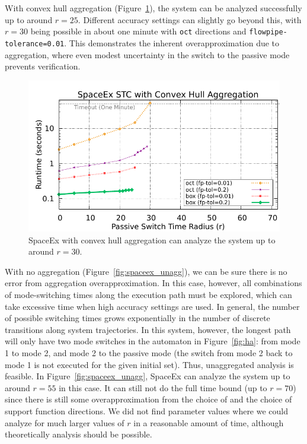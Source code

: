 With convex hull aggregation (Figure~\ref{fig:spaceex_chull}), the system can be analyzed successfully up to around $r=25$.
%
Different accuracy settings can slightly go beyond this, with $r=30$ being possible in about one minute with \texttt{oct} directions and
\texttt{flowpipe-tolerance=0.01}.
%
This demonstrates the inherent overapproximation due to aggregation, where even modest uncertainty in the switch to the passive mode
prevents verification.

\begin{figure}[t]
\centerline{\includegraphics[width=0.9\columnwidth]{images/chull.pdf}}
\caption{SpaceEx with convex hull aggregation can analyze the system up to around $r=30$.}
\label{fig:spaceex_chull}
\end{figure}

With no aggregation (Figure~\ref{fig:spaceex_unagg}), we can be sure there is no error from aggregation overapproximation.
%
In this case, however, all combinations of mode-switching times along the execution path must be explored,
which can take excessive time when high accuracy settings are used.
%
In general, the number of possible switching times grows exponentially in the number of discrete transitions along system trajectories.
%
In this system, however, the longest path will only have two mode switches in the automaton in Figure~\ref{fig:ha}:
from mode 1 to mode 2, and mode 2 to the passive mode (the switch from mode 2 back to mode 1 is not executed for the given initial set).
%
Thus, unaggregated analysis is feasible.
%
In Figure~\ref{fig:spaceex_unagg}, SpaceEx can analyze the system up to around $r=55$ in this case.
%
It can still not do the full time bound (up to $r=70$) since there is still some overapproximation from the choice of  and the
choice of support function directions.
%
We did not find parameter values where we could analyze for much larger values of $r$ in a reasonable amount of time,
although theoretically analysis should be possible.

